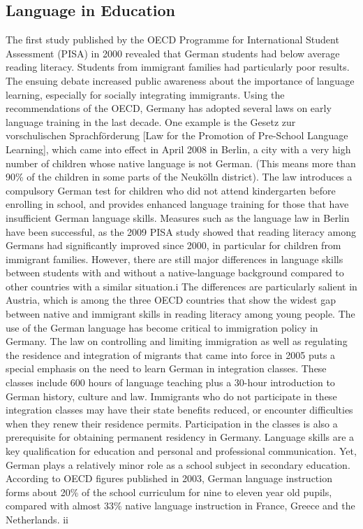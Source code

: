 \documentclass[]{../metanetpaper}
\begin{document}
	\subsection{Language in Education}
The first study published by the OECD Programme for International Student Assessment (PISA) in 2000 revealed that German students had below average reading literacy. Students from immigrant families had particularly poor results. The ensuing debate increased public awareness about the importance of language learning, especially for socially integrating immigrants. 
Using the recommendations of the OECD, Germany has adopted several laws on early language training in the last decade. One example is the Gesetz zur vorschulischen Sprachförderung [Law for the Promotion of Pre-School Language Learning], which came into effect in April 2008 in Berlin, a city with a very high number of children whose native language is not German. (This means more than 90\% of the children in some parts of the Neukölln district). The law introduces a compulsory German test for children who did not attend kindergarten before enrolling in school, and provides enhanced language training for those that have insufficient German language skills.
Measures such as the language law in Berlin have been successful, as the 2009 PISA study showed that reading literacy among Germans had significantly improved since 2000, in particular for children from immigrant families. However, there are still major differences in language skills between students with and without a native-language background compared to other countries with a similar situation.i The differences are particularly salient in Austria, which is among the three OECD countries that show the widest gap between native and immigrant skills in reading literacy among young people.
The use of the German language has become critical to immigration policy in Germany. The law on controlling and limiting immigration as well as regulating the residence and integration of migrants that came into force in 2005 puts a special emphasis on the need to learn German in integration classes. These classes include 600 hours of language teaching plus a 30-hour introduction to German history, culture and law. Immigrants who do not participate in these integration classes may have their state benefits reduced, or encounter difficulties when they renew their residence permits. Participation in the classes is also a prerequisite for obtaining permanent residency in Germany.
Language skills are a key qualification for education and personal and professional communication. Yet, German plays a relatively minor role as a school subject in secondary education. According to OECD figures published in 2003, German language instruction forms about 20\% of the school curriculum for nine to eleven year old pupils, compared with almost 33\% native language instruction in France, Greece and the Netherlands. ii
\end{document}

